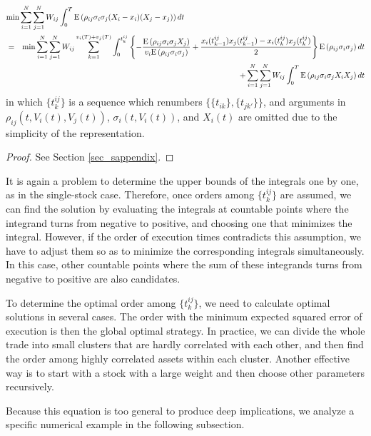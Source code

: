 \begin{proposition}\label{prop_s5}
\begin{eqnarray*}
 \lefteqn{\min \sum_{i=1}^N \sum_{j=1}^N W_{ij} \int_0^T \ex{\rho_{ij}\sigma_i\sigma_j(X_i-x_i)(X_j-x_j)}dt} \nonumber \\
    & = & \min \sum_{i=1}^N \sum_{j=1}^N W_{ij} \sum_{k=1}^{v_i(T)+v_j(T)} \int_0^{t_k^{ij}}\left\{-\frac{\ex{\rho_{ij}\sigma_i\sigma_jX_j}}{v_i\ex{\rho_{ij}\sigma_i\sigma_j}}+\frac{x_i(t_{k-1}^{ij})x_j(t_{k-1}^{ij})-x_i(t_k^{ij})x_j(t_k^{ij})}{2}\right\} \ex{\rho_{ij}\sigma_i\sigma_j} dt \nonumber \\
    &   & +\sum_{i=1}^N \sum_{j=1}^N W_{ij}\int_0^T \ex{\rho_{ij}\sigma_i\sigma_jX_iX_j}dt \label{eq_s9}
\end{eqnarray*}
in which $\{t_k^{ij}\}$ is a sequence which renumbers $\{\{t_{ik}\},\{t_{jk'}\}\}$, and arguments in $\rho_{ij}(t,V_i(t),V_j(t))$, $\sigma_i(t,V_i(t))$, and $X_i(t)$ are omitted due to the simplicity of the representation.
\end{proposition}

\begin{proof}
  See Section \ref{sec_sappendix}.
\end{proof}

It is again a problem to determine the upper bounds of the integrals one by one, as in the single-stock case.  Therefore, once orders among $\{t_k^{ij}\}$ are assumed, we can find the solution by evaluating the integrals at countable points where the integrand turns from negative to positive, and choosing one that minimizes the integral.  However, if the order of execution times contradicts this assumption, we have to adjust them so as to minimize the corresponding integrals simultaneously.  In this case, other countable points where the sum of these integrands turns from negative to positive are also candidates. 

To determine the optimal order among $\{t_k^{ij}\}$, we need to calculate optimal solutions in several cases.  The order with the minimum expected squared error of execution is then the global optimal strategy.  In practice, we can divide the whole trade into small clusters that are hardly correlated with each other, and then find the order among highly correlated assets within each cluster.  Another effective way is to start with a stock with a large weight and then choose other parameters recursively.

Because this equation is too general to produce deep implications, we analyze a specific numerical example in the following subsection.


